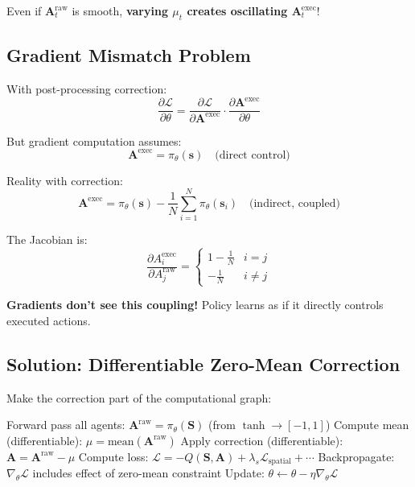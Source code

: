 \documentclass[11pt,a4paper]{article}
\theoremstyle{definition}
\begin{document}
Even if $\mathbf{A}^{\text{raw}}_t$ is smooth, \textbf{varying $\mu_t$ creates oscillating $\mathbf{A}^{\text{exec}}_t$}!

\subsection{Gradient Mismatch Problem}

With post-processing correction:
\begin{equation}
\frac{\partial \mathcal{L}}{\partial \theta} = \frac{\partial \mathcal{L}}{\partial \mathbf{A}^{\text{exec}}} \cdot \frac{\partial \mathbf{A}^{\text{exec}}}{\partial \theta}
\end{equation}

But gradient computation assumes:
\begin{equation}
\mathbf{A}^{\text{exec}} = \pi_\theta(\mathbf{s}) \quad \text{(direct control)}
\end{equation}

Reality with correction:
\begin{equation}
\mathbf{A}^{\text{exec}} = \pi_\theta(\mathbf{s}) - \frac{1}{N}\sum_{i=1}^N \pi_\theta(\mathbf{s}_i) \quad \text{(indirect, coupled)}
\end{equation}

The Jacobian is:
\begin{equation}
\frac{\partial A_i^{\text{exec}}}{\partial A_j^{\text{raw}}} = \begin{cases}
1 - \frac{1}{N} & i = j \\
-\frac{1}{N} & i \neq j
\end{cases}
\end{equation}

\textbf{Gradients don't see this coupling!} Policy learns as if it directly controls executed actions.

\subsection{Solution: Differentiable Zero-Mean Correction}

Make the correction part of the computational graph:

\begin{algorithm}
\caption{Differentiable Zero-Mean (Correct)}
\begin{algorithmic}[1]
\STATE Forward pass all agents: $\mathbf{A}^{\text{raw}} = \pi_\theta(\mathbf{S})$ \quad (from $\tanh \to [-1,1]$)
\STATE Compute mean (differentiable): $\mu = \text{mean}(\mathbf{A}^{\text{raw}})$
\STATE Apply correction (differentiable): $\mathbf{A} = \mathbf{A}^{\text{raw}} - \mu$
\STATE Compute loss: $\mathcal{L} = -Q(\mathbf{S}, \mathbf{A}) + \lambda_s \mathcal{L}_{\text{spatial}} + \cdots$
\STATE Backpropagate: $\nabla_\theta \mathcal{L}$ includes effect of zero-mean constraint
\STATE Update: $\theta \leftarrow \theta - \eta \nabla_\theta \mathcal{L}$
\end{algorithmic}
\end{algorithm}
\end{document}
